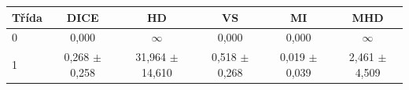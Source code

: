\begin{tabular}{l c c c c c}
 \hline
Třída & DICE & HD & VS & MI & MHD \\ \hline
0 & 0,000 & $\infty$ & 0,000 & 0,000 & $\infty$ \\
1 & 0,268 $\pm$ 0,258 & 31,964 $\pm$ 14,610 & 0,518 $\pm$ 0,268 & 0,019 $\pm$ 0,039 & 2,461 $\pm$ 4,509 \\
\hline 
 \end{tabular}
